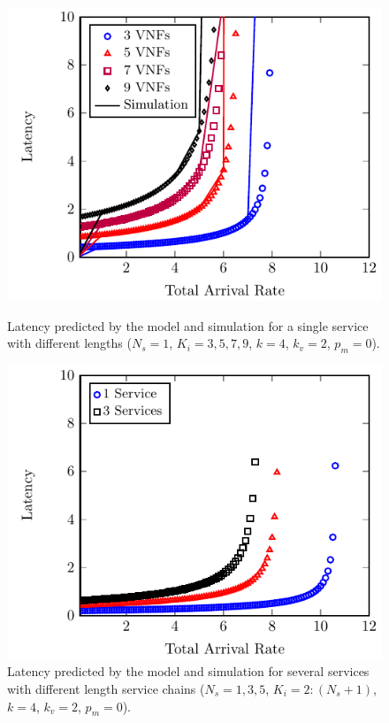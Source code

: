 
\begin{figure}

	\begin{minipage}[b]{.49\textwidth}
		\includegraphics[width=\linewidth]{graphs/diff_lengths}
		\caption{Latency predicted by the model and simulation for a single service with different lengths ($N_s=1$, $K_i={3,5,7,9}$, $k=4$, $k_v =2$, $p_m=0$).}
		\label{fig:length_chain}
	\end{minipage}
	\hfill
	\begin{minipage}[b]{.49\textwidth}
		\includegraphics[width=\linewidth]{graphs/mult_services}
		\caption{Latency predicted by the model and simulation for several services
		with different length service chains ($N_s={1,3,5}$, $K_i=2:(N_s+1)$, $k=4$, $k_v=2$, $p_m=0$).}
		\label{fig:mult_services}
	\end{minipage}


\end{figure}
